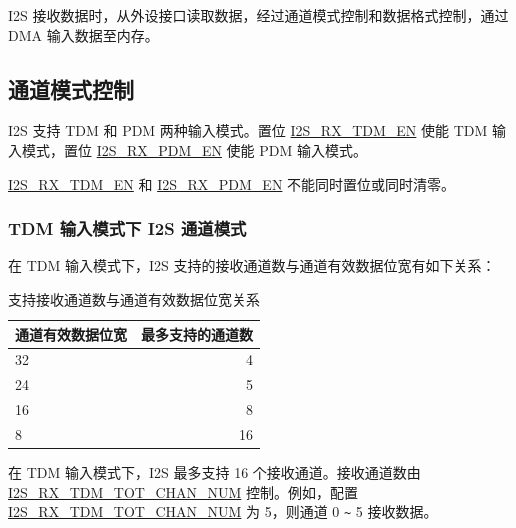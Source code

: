 \documentclass[main\_\_CN.tex]{subfiles}
\begin{document}
I2S 接收数据时，从外设接口读取数据，经过通道模式控制和数据格式控制，通过 DMA 输入数据至内存。

\subsection{通道模式控制}
\chipname{} I2S 支持 TDM 和 PDM 两种输入模式。置位 \hyperref[fielddesc:I2SRXTDMEN]{I2S\_RX\_TDM\_EN} 使能 TDM 输入模式，置位 \hyperref[fielddesc:I2SRXPDMEN]{I2S\_RX\_PDM\_EN} 使能 PDM 输入模式。

\begin{tiplisting}
\hyperref[fielddesc:I2SRXTDMEN]{I2S\_RX\_TDM\_EN} 和 \hyperref[fielddesc:I2SRXPDMEN]{I2S\_RX\_PDM\_EN} 不能同时置位或同时清零。
\end{tiplisting}

\subsubsection{TDM 输入模式下 I2S 通道模式}
在 TDM 输入模式下，I2S 支持的接收通道数与通道有效数据位宽有如下关系：

\begin{table}[H]
    \centering
    \caption{支持接收通道数与通道有效数据位宽关系}
    \label{tab:i2s-rx-support-channel}
    \begin{tabular}{|l|r|}
    \hline
    \rowcolor{lightgray}
    \textbf{通道有效数据位宽} & \textbf{最多支持的通道数} \\ \hline
        32  & 4     \\\hline
        24  & 5     \\\hline
        16  & 8     \\\hline
        8   & 16    \\\hline
    \end{tabular}
\end{table}

在 TDM 输入模式下，I2S 最多支持 16 个接收通道。接收通道数由 \hyperref[fielddesc:I2SRXTDMTOTCHANNUM]{I2S\_RX\_TDM\_TOT\_CHAN\_NUM} 控制。例如，配置 \hyperref[fielddesc:I2SRXTDMTOTCHANNUM]{I2S\_RX\_TDM\_TOT\_CHAN\_NUM} 为 5，则通道 0 \verb+~+ 5 接收数据。
\end{document}
